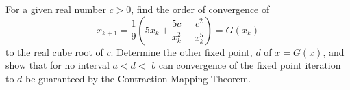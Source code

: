 \documentclass[answers]{exam}
\begin{document}
\begin{questions}
\question%
For a given real number $c>0$, find the order of convergence of \[
	x_{k+1}=\frac{1}{9}\left(5 x_{k}+\frac{5 c}{x_{k}^{2}}-\frac{c^{2}}{x_{k}^{5}}\right)=G\left(x_{k}\right)
\] to the real cube root of $c$. Determine the other fixed point, $d$ of $x=G(x)$, and show that for no interval $a<d<$ $b$ can convergence of the fixed point iteration to $d$ be guaranteed by the Contraction Mapping Theorem.

\end{questions}
\end{document}
